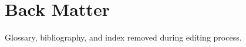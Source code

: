 \documentclass[oneside, openany]{book}
\providecommand\phantomsection{}
\begin{document}
%
%
%

\appendix


\backmatter
\pagestyle{plain}

\chapter{Back Matter}

Glossary, bibliography, and index removed during editing process.

%
%
%
%

\clearpage

\immediate\closeout\outputstream
\end{document}
